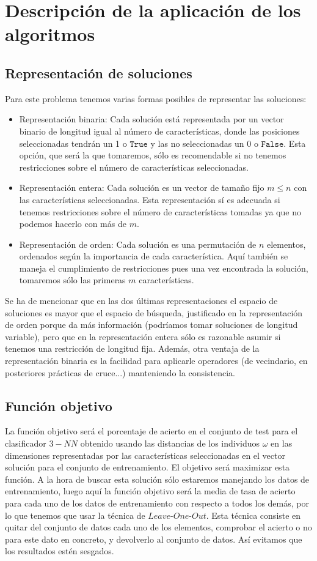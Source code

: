 \documentclass[11pt,leqno]{article}
\begin{document}
\section{Descripción de la aplicación de los algoritmos}
\subsection{Representación de soluciones}
	Para este problema tenemos varias formas posibles de representar las soluciones:
	\begin{itemize}
		\item Representación binaria: Cada solución está representada por un vector binario de longitud igual al número de características, donde las posiciones seleccionadas tendrán un 1 o $\texttt{True}$ y las no seleccionadas un 0 o $\texttt{False}$. Esta opción, que será la que tomaremos, sólo es recomendable si no tenemos restricciones sobre el número de características seleccionadas.
		\item Representación entera: Cada solución es un vector de tamaño fijo $m \leq n$ con las características seleccionadas. Esta representación sí es adecuada si tenemos restricciones sobre el número de características tomadas ya que no podemos hacerlo con más de $m$.
		\item Representación de orden: Cada solución es una permutación de $n$ elementos, ordenados según la importancia de cada característica. Aquí también se maneja el cumplimiento de restricciones pues una vez encontrada la solución, tomaremos sólo las primeras $m$ características.
	\end{itemize}
	Se ha de mencionar que en las dos últimas representaciones el espacio de soluciones es mayor que el espacio de búsqueda, justificado en la representación de orden porque da más información (podríamos tomar soluciones de longitud variable), pero que en la representación entera sólo es razonable asumir si tenemos una restricción de longitud fija. Además, otra ventaja de la representación binaria es la facilidad para aplicarle operadores (de vecindario, en posteriores prácticas de cruce...) manteniendo la consistencia.

\subsection{Función objetivo}
	La función objetivo será el porcentaje de acierto en el conjunto de test para el clasificador $3-NN$ obtenido usando las distancias de los individuos $\omega$ en las dimensiones representadas por las características seleccionadas en el vector solución para el conjunto de entrenamiento. El objetivo será maximizar esta función. A la hora de buscar esta solución sólo estaremos manejando los datos de entrenamiento, luego aquí la función objetivo será la media de tasa de acierto para cada uno de los datos de entrenamiento con respecto a todos los demás, por lo que tenemos que usar la técnica de $\textit{Leave-One-Out}$. Esta técnica consiste en quitar del conjunto de datos cada uno de los elementos, comprobar el acierto o no para este dato en concreto, y devolverlo al conjunto de datos. Así evitamos que los resultados estén sesgados.
	
\end{document}
